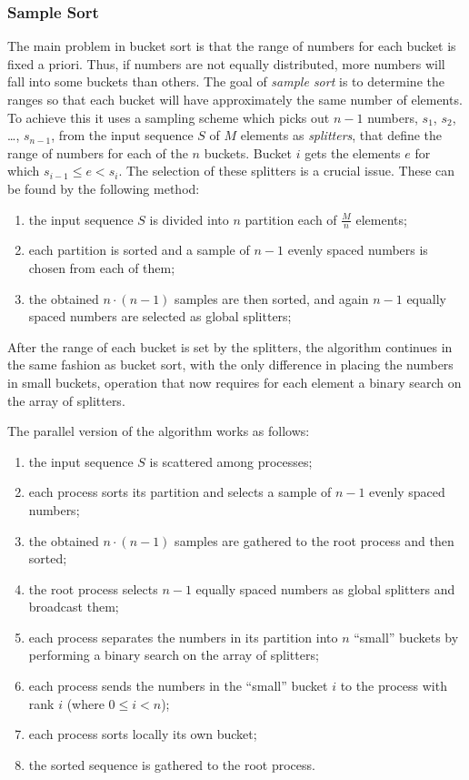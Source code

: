 \subsubsection{Sample Sort}
The main problem in bucket sort is that the range of numbers for each bucket is fixed a priori. Thus, if numbers are not equally distributed, more numbers will fall into some buckets than others.
The goal of \textit{sample sort} is to determine the ranges so that each bucket will have approximately the same number of elements. To achieve this it uses a sampling scheme which picks out $n-1$ numbers, $s_1$, $s_2$, \dots, $s_{n-1}$, from the input sequence $S$ of $M$ elements as \textit{splitters}, that define the range of numbers for each of the $n$ buckets. Bucket $i$ gets the elements $e$ for which $s_{i-1} \leq e < s_i$. The selection of these splitters is a crucial issue. These can be found by the following method:
\begin{enumerate}	
	\item the input sequence $S$ is divided into $n$ partition each of $\frac{M}{n}$ elements;
	\item each partition is sorted and a sample of $n-1$ evenly spaced numbers is chosen from each of them;
	\item the obtained $n \cdot (n-1)$ samples are then sorted, and again $n-1$ equally spaced numbers are selected as global splitters;
\end{enumerate}
After the range of each bucket is set by the splitters, the algorithm continues in the same fashion as bucket sort, with the only difference in placing the numbers in small buckets, operation that now requires for each element a binary search on the array of splitters.

The parallel version of the algorithm works as follows:
\begin{enumerate}	
	\item the input sequence $S$ is scattered among processes;
	\item each process sorts its partition and selects a sample of $n-1$ evenly spaced numbers;
	\item the obtained $n \cdot (n-1)$ samples are gathered to the root process and then sorted;
	\item the root process selects $n-1$ equally spaced numbers as global splitters and broadcast them;
	\item each process separates the numbers in its partition into $n$ ``small'' buckets by performing a binary search on the array of splitters;
	\item each process sends the numbers in the ``small'' bucket $i$ to the process with rank $i$ (where $0 \leq i < n$);
	\item each process sorts locally its own bucket;
	\item the sorted sequence is gathered to the root process.
\end{enumerate}
